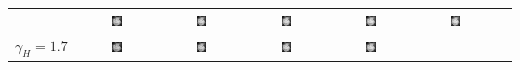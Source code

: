 \begin{tabular}{ T S @{} S @{} S @{} S @{} S @{} S }
  & \includegraphics[width=0.135\textwidth]{../images/girl_3_16}
  & \includegraphics[width=0.135\textwidth]{../images/girl_4_16}
  & \includegraphics[width=0.135\textwidth]{../images/girl_5_16}
  & \includegraphics[width=0.135\textwidth]{../images/girl_6_16}
  & \includegraphics[width=0.135\textwidth]{../images/girl_7_16} \\ [-4pt]
  $\gamma_H=1.7$
  & \includegraphics[width=0.135\textwidth]{../images/girl_2_17}
  & \includegraphics[width=0.135\textwidth]{../images/girl_3_17}
  & \includegraphics[width=0.135\textwidth]{../images/girl_4_17}
  & \includegraphics[width=0.135\textwidth]{../images/girl_5_17}

\end{tabular}

